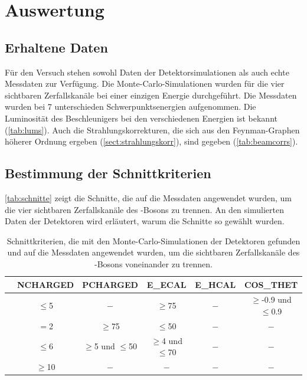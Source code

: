 \section{Auswertung}
\subsection{Erhaltene Daten}
Für den Versuch stehen sowohl Daten der Detektorsimulationen
als auch echte Messdaten zur Verfügung.
Die Monte-Carlo-Simulationen wurden für die vier sichtbaren Zerfallskanäle bei einer einzigen Energie durchgeführt.
Die Messdaten wurden bei 7 unterschieden Schwerpunktsenergien aufgenommen.
Die Luminosität des Beschleunigers bei den verschiedenen Energien ist bekannt (\autoref{tab:lums}).
Auch die Strahlungskorrekturen, die sich aus den Feynman-Graphen höherer Ordnung
ergeben (\autoref{sect:strahlungskorr}), sind gegeben (\autoref{tab:beamcorrs}).





\subsection{Bestimmung der Schnittkriterien}
\autoref{tab:schnitte} zeigt die Schnitte,
die auf die Messdaten angewendet wurden,
um die vier sichtbaren Zerfallskanäle des \Z-Bosons zu trennen.
An den simulierten Daten der Detektoren wird erläutert, warum die Schnitte so gewählt wurden.

\begin{table}[H]
    \caption{Schnittkriterien, die mit den Monte-Carlo-Simulationen der Detektoren gefunden und
    auf die Messdaten angewendet wurden, um die sichtbaren Zerfallskanäle des \Z-Bosons voneinander zu trennen.}
    \begin{center}
        \begin{tabular}{|c||c|c|c|c|c|}
            \hline
        	& NCHARGED	& PCHARGED				& E\_ECAL				& E\_HCAL	& COS\_THET						\\ \hline\hline
   \Zee		& $\leq$5	& $-$					& $\geq$75				& $-$		& $\geq$-0.9 und $\leq$0.9		\\ \hline
   \Zmm		& $=$2		& $\geq$75				& $\leq$50				& $-$		& $-$							\\ \hline
   \Ztt		& $\leq$6	& $\geq$5 und $\leq$50	& $\geq$4 und $\leq$70	& $-$		& $-$							\\ \hline
   \Zqq		& $\geq$10	& $-$					& $-$					& $-$		& $-$							\\ \hline

        \end{tabular}
    \end{center}
    \label{tab:schnitte}
\end{table}

